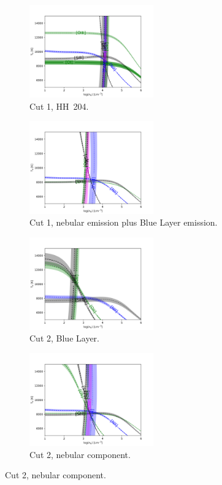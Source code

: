 \documentclass[twocolumn]{aastex63}
\begin{document}
\begin{figure}
\centering
  \begin{subfigure}{7.5cm}
    \centering\includegraphics[height=4cm,width=\columnwidth]{physical_diag_HH204.png}

    \caption{Cut 1, HH~204.}
  \end{subfigure}
  \begin{subfigure}{7.5cm}
    \centering\includegraphics[height=4cm,width=\columnwidth]{physical_diag_nebandbluelayer.png}
    \caption{Cut 1, nebular emission plus Blue Layer emission.}
  \end{subfigure}
 
  \begin{subfigure}{7.5cm}
    \centering\includegraphics[height=4cm,width=\columnwidth]{physical_diag_blue_layer.png}
    \caption{Cut 2, Blue Layer.}
  \end{subfigure}
  \begin{subfigure}{7.5cm}

    \centering\includegraphics[height=4cm,width=\columnwidth]{physical_diag_nebular.png}
    \caption{Cut 2, nebular component.}
  \end{subfigure}


\end{figure}
\end{document}
